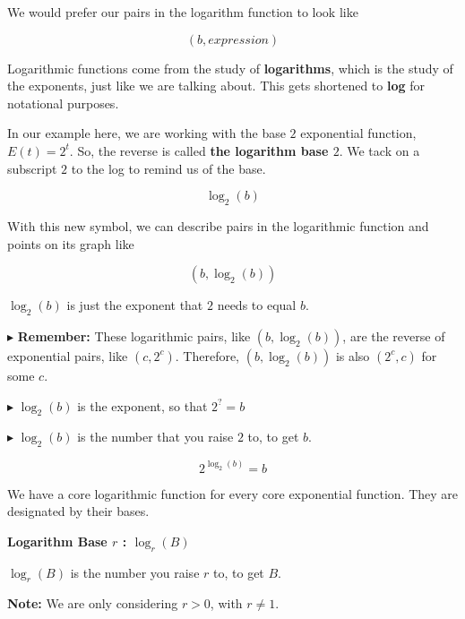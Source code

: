 \documentclass{ximera}
\begin{document}
We would prefer our pairs in the logarithm function to look like 

\[ (b, expression)  \]







Logarithmic functions come from the study of \textbf{logarithms}, which is the study of the exponents, just like we are talking about. This gets shortened to \textbf{log} for notational purposes.  



In our example here, we are working with the base $2$ exponential function, $E(t) = 2^t$. So, the reverse is called \textbf{the logarithm base $2$}.  We tack on a subscript $2$ to the log to remind us of the base.



\[   \log_2(b)     \]


With this new symbol, we can describe pairs in the logarithmic function and points on its graph like 


\[
(b, \log_2(b))
\]


$\log_2(b)$ is just the exponent that $2$ needs to equal $b$.





$\blacktriangleright$ \textbf{Remember:} These logarithmic pairs, like $(b, \log_2(b))$, are the reverse of exponential pairs, like $(c, 2^c)$.  Therefore, $(b, \log_2(b))$ is also $(2^c, c)$ for some $c$. 

$\blacktriangleright$  $\log_2(b)$ is the exponent, so that $2^? = b$ 


$\blacktriangleright$  $\log_2(b)$ is the number that you raise $2$ to, to get $b$.  

\[   2^{\log_2(b)} = b     \]

We have a core logarithmic function for every core exponential function.  They are designated by their bases.














\begin{definition} \textbf{\textcolor{green!50!black}{Logarithm Base $r$ : $\log_r(B)$}}

\begin{center}
$\log_r(B)$ is the number you raise $r$ to, to get $B$. 
\end{center}

\textbf{Note:} We are only considering $r > 0$, with $r \ne 1$.

\end{definition}
\end{document}
